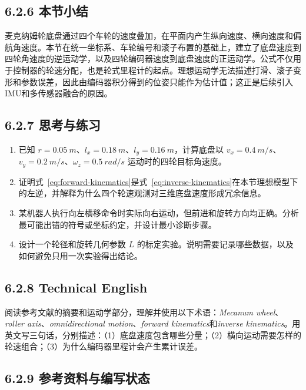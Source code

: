 \documentclass[UTF8,zihao=-4]{ctexart}
\begin{document}
\subsection*{6.2.6 本节小结}

麦克纳姆轮底盘通过四个车轮的速度叠加，在平面内产生纵向速度、横向速度和偏航角速度。本节在统一坐标系、车轮编号和滚子布置的基础上，建立了底盘速度到四轮角速度的逆运动学，以及四轮编码器速度到底盘速度的正运动学。公式不仅用于控制器的轮速分配，也是轮式里程计的起点。理想运动学无法描述打滑、滚子变形和参数误差，因此由编码器积分得到的位姿只能作为估计值；这正是后续引入IMU和多传感器融合的原因。

\subsection*{6.2.7 思考与练习}

\begin{enumerate}
  \item 已知 $r=\SI{0.05}{m}$、$l_x=\SI{0.18}{m}$、$l_y=\SI{0.16}{m}$，计算底盘以 $v_x=\SI{0.4}{m/s}$、$v_y=\SI{0.2}{m/s}$、$\omega_z=\SI{0.5}{rad/s}$ 运动时的四轮目标角速度。
  \item 证明式~\eqref{eq:forward-kinematics}是式~\eqref{eq:inverse-kinematics}在本节理想模型下的左逆，并解释为什么四个轮速观测对三维底盘速度形成冗余信息。
  \item 某机器人执行向左横移命令时实际向右运动，但前进和旋转方向均正确。分析最可能出错的符号或坐标约定，并设计最小诊断步骤。
  \item 设计一个轮径和旋转几何参数 $L$ 的标定实验。说明需要记录哪些数据，以及如何避免只用一次实验得出结论。
\end{enumerate}

\subsection*{6.2.8 Technical English}

阅读参考文献\cite{gfrerrer2008}的摘要和运动学部分，理解并使用以下术语：\emph{Mecanum wheel}、\emph{roller axis}、\emph{omnidirectional motion}、\emph{forward kinematics}和\emph{inverse kinematics}。用英文写三句话，分别描述：（1）底盘速度包含哪些分量；（2）横向运动需要怎样的轮速组合；（3）为什么编码器里程计会产生累计误差。

\subsection*{6.2.9 参考资料与编写状态}
\end{document}
